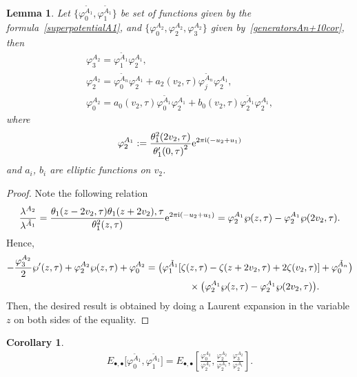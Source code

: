 \documentclass[10pt,a4paper]{amsart}
\numberwithin{equation}{section}
\newtheorem{Corollary}[Theorem]{Corollary}
\newtheorem{Lemma}[Theorem]{Lemma}
\begin{document}
\begin{Lemma}
{\sloppy
Let $\big\{\varphi_0^{\tilde A_1 },\varphi_1^{\tilde A_1 }\big\}$ be set of functions given by the formula~\eqref{superpotentialA1}, and $\big\{\varphi_0^{A_{2}},\varphi_2^{A_{2}},\varphi_3^{A_{2}}\big\}$ given by~\eqref{generatorsAn+10cor}, then
\begin{gather*}
\varphi_{3}^{A_{2}}=\varphi_{1}^{\tilde A_{1}}\varphi_{2}^{A_{1}},\\
\varphi_{2}^{A_{2}}=\varphi_{0}^{\tilde A_{n}}\varphi_{2}^{A_{1}}+ a_2(v_2,\tau)\varphi_{j}^{\tilde A_{n}}\varphi_{2}^{A_{1}},\\
\varphi_{0}^{A_{2}}= a_0(v_2,\tau)\varphi_{0}^{\tilde A_{1}}\varphi_{2}^{A_{1}}+b_0(v_2,\tau)\varphi_{2}^{\tilde A_{1}}\varphi_{2}^{A_{1}},
\end{gather*}}
where
\begin{gather*}
\varphi_2^{A_1}:=\frac{\theta_1^2(2v_{2},\tau)}{{\theta_1^{\prime}(0,\tau)}^2}{\rm e}^{2\pi {\rm i} (-u_2+u_1)}
\end{gather*}
and $a_i$, $b_i$ are elliptic functions on $v_{2}$.

\end{Lemma}
\begin{proof}
Note the following relation
\begin{gather*}
\frac{\lambda^{A_{2}}}{\lambda^{\tilde A_1}}=\frac{\theta_1(z-2v_{2},\tau)\theta_1(z+2v_{2}),\tau} {\theta_1^2(z,\tau)}{\rm e}^{2\pi {\rm i}(-u_2+u_1)}
=\varphi_2^{A_1}\wp(z,\tau)-\varphi_2^{A_1}\wp(2v_2,\tau).
\end{gather*}
Hence,
\begin{gather*}
-\frac{\varphi_{3}^{A_{2}}}{2}\wp^{\prime}(z,\tau)+\varphi_{2}^{A_{2}}\wp(z,\tau)+\varphi_{0}^{A_{2}}
=\big(\varphi_{1}^{\tilde A_1}[\zeta(z,\tau)-\zeta(z+2v_{2},\tau)+2\zeta(v_2,\tau)]+\varphi_0^{\tilde A_n}\big)
\\ \hphantom{-\frac{\varphi_{3}^{A_{2}}}{2}\wp^{\prime}(z,\tau)+ \varphi_{2}^{A_{2}}\wp(z,\tau)+\varphi_{0}^{A_{2}}=}
{}\times\big(\varphi_2^{A_1}\wp(z,\tau)-\varphi_2^{A_1}\wp(2v_{2},\tau)\big).
\end{gather*}
Then, the desired result is obtained by doing a Laurent expansion in the variable $z$ on both sides of the equality.
\end{proof}

\begin{Corollary}
\begin{gather*}
E_{\bullet,\bullet}\big[\varphi_0^{\tilde A_1 },\varphi_1^{\tilde A_1 }\big]=E_{\bullet,\bullet}\left[\frac{\varphi_0^{A_{2}}}{\varphi_2^{A_1}}, \frac{\varphi_2^{A_{2}}}{\varphi_2^{A_1}},\frac{\varphi_3^{A_{2}}}{\varphi_2^{A_1}}\right].
\end{gather*}
\end{Corollary}
\end{document}
